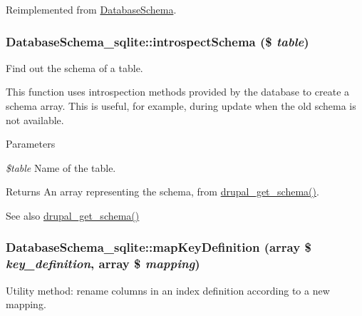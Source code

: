 Reimplemented from \hyperlink{classDatabaseSchema_ae343d2fd453d51d9df43d439af0a22e2}{DatabaseSchema}.\hypertarget{classDatabaseSchema__sqlite_a55c7b8fe7ea795bd62c4c8aec8d88f3d}{
\subsubsection[{introspectSchema}]{\setlength{\rightskip}{0pt plus 5cm}DatabaseSchema\_\-sqlite::introspectSchema (\$ {\em table})}}
\label{classDatabaseSchema__sqlite_a55c7b8fe7ea795bd62c4c8aec8d88f3d}
Find out the schema of a table.

This function uses introspection methods provided by the database to create a schema array. This is useful, for example, during update when the old schema is not available.


\begin{DoxyParams}{Parameters}
\item[{\em \$table}]Name of the table. \end{DoxyParams}
\begin{DoxyReturn}{Returns}
An array representing the schema, from \hyperlink{group__schemaapi_ga979670bd6bd2e34337ffc5f0810f2d71}{drupal\_\-get\_\-schema()}. 
\end{DoxyReturn}
\begin{DoxySeeAlso}{See also}
\hyperlink{group__schemaapi_ga979670bd6bd2e34337ffc5f0810f2d71}{drupal\_\-get\_\-schema()} 
\end{DoxySeeAlso}
\hypertarget{classDatabaseSchema__sqlite_a0a3875b0867fb7e95508ca54a5958f5d}{
\subsubsection[{mapKeyDefinition}]{\setlength{\rightskip}{0pt plus 5cm}DatabaseSchema\_\-sqlite::mapKeyDefinition (array \$ {\em key\_\-definition}, \/  array \$ {\em mapping})}}
\label{classDatabaseSchema__sqlite_a0a3875b0867fb7e95508ca54a5958f5d}
Utility method: rename columns in an index definition according to a new mapping.


